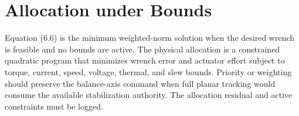 \section{Allocation under Bounds}\label{f.4-allocation-under-bounds}

Equation (6.6) is the minimum weighted-norm solution when the desired
wrench is feasible and no bounds are active. The physical allocation is
a constrained quadratic program that minimizes wrench error and actuator
effort subject to torque, current, speed, voltage, thermal, and slew
bounds. Priority or weighting should preserve the balance-axis command
when full planar tracking would consume the available stabilization
authority. The allocation residual and active constraints must be
logged.
